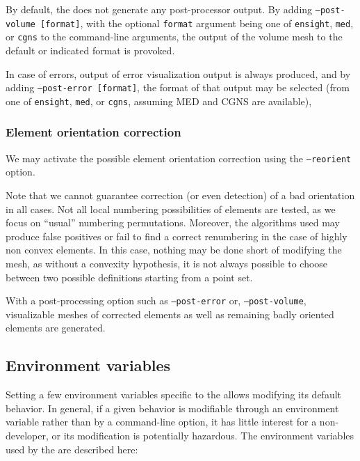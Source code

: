{{{By default, the \pcs does not generate any post-processor output.
By adding \texttt{--post-volume [format]},
with the optional \texttt{format} argument being one of \texttt{ensight},
\texttt{med}, or \texttt{cgns} to the command-line arguments,
the output of the volume mesh to the default or indicated format
is provoked.

In case of errors, output of error visualization output is always
produced, and by adding \texttt{--post-error [format]},
the format of that output may be selected (from one of \texttt{ensight},
\texttt{med}, or \texttt{cgns}, assuming MED and CGNS are
available),

\subsubsection{Element orientation correction\label{sec:optpcs:orient}}

We may activate the possible element orientation correction using the
\texttt{--reorient} option.

Note that we cannot guarantee correction (or even detection) of a bad
orientation in all cases.
Not all local numbering possibilities of elements are tested,
as we focus on ``usual'' numbering permutations. Moreover,
the algorithms used may produce false positives or fail to find
a correct renumbering in the case of highly non convex elements.
In this case, nothing may be done short of modifying the mesh, as
without a convexity hypothesis, it is not always possible to choose
between two possible definitions starting from a point set.

With a post-processing option such as \texttt{--post-error}
or, \texttt{--post-volume},
visualizable meshes of corrected elements as well as remaining
badly oriented elements are generated.

\subsection{Environment variables\label{sec:envvpcs}}

Setting a few environment variables specific to the \pcs allows modifying
its default behavior. In general, if a given behavior is modifiable
through an environment variable rather than by a command-line option,
it has little interest for a non-developer, or its modification is
potentially hazardous. The environment variables used by the \pcs
are described here:


}}}
